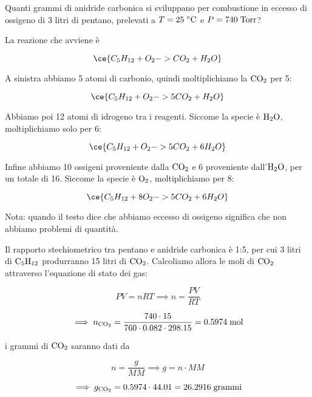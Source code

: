 \begin{esercizio}
    Quanti grammi di anidride carbonica si sviluppano per combustione in eccesso di ossigeno di 3 litri di pentano, prelevati a $T=25 \; ^{\circ} \rm C$ e $P=740 \; \rm Torr$?
\end{esercizio}
\begin{soluzione}
    La reazione che avviene è

$$\ce{ C_5H_{12} + O_2 -> CO_2 + H_2O}$$

A sinistra abbiamo 5 atomi di carbonio, quindi moltiplichiamo la $\rm CO_2$ per 5:

$$\ce{ C_5H_{12} + O_2 -> 5CO_2 + H_2O}$$

Abbiamo poi 12 atomi di idrogeno tra i reagenti. Siccome la specie è $\rm H_2O$, moltiplichiamo solo per 6:

$$\ce{ C_5H_{12} + O_2 -> 5CO_2 + 6H_2O}$$

Infine abbiamo 10 ossigeni proveniente dalla $\rm CO_2$ e 6 proveniente dall'$\rm H_2O$, per un totale di 16. Siccome la specie è $\rm O_2$, moltiplichiamo per 8:

$$\ce{ C_5H_{12} + 8O_2 -> 5CO_2 + 6H_2O}$$

Nota: quando il testo dice che abbiamo eccesso di ossigeno significa che non abbiamo problemi di quantità.

\vspace{0.2cm}Il rapporto stechiometrico tra pentano e anidride carbonica è 1:5, per cui 3 litri di $\rm C_5H_{12}$ produrranno 15 litri di $\rm CO_2$. Calcoliamo allora le moli di $\rm CO_2$ attraverso l'equazione di stato dei gas:

$$PV=nRT
\implies
n=\frac{PV}{RT}$$

$$\implies n_{\rm CO_2}
=\frac{740 \cdot 15}{760 \cdot 0.082 \cdot 298.15}
=0.5974 \; \rm mol$$

i grammi di $\rm CO_2$ saranno dati da

$$n=\frac{g}{MM}
\implies
g=n \cdot MM$$

$$\implies g_{\rm CO_2}=0.5974 \cdot 44.01=26.2916 \; \rm grammi$$
\end{soluzione}

\newpage


